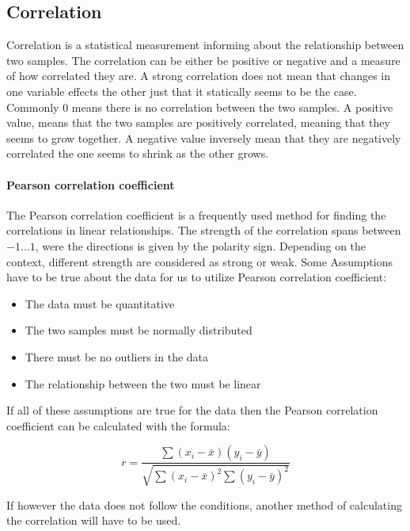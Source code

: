 \subsection{Correlation}
Correlation is a statistical measurement informing about the relationship between two samples. The correlation can be either be positive or negative and a measure of how correlated they are. A strong correlation does not mean that changes in one variable effects the other just that it statically seems to be the case. Commonly $0$ means there is no correlation between the two samples. A positive value, means that the two samples are positively correlated, meaning that they seems to grow together. A negative value inversely mean that they are negatively correlated the one seems to shrink as the other grows.

\paragraph{Pearson correlation coefficient} The Pearson correlation coefficient is a frequently used method for finding the correlations in linear relationships. The strength of the correlation spans between $-1 \dotsc 1$, were the directions is given by the polarity sign. Depending on the context, different strength are considered as strong or weak. Some Assumptions have to be true about the data for us to utilize Pearson correlation coefficient:

\begin{itemize}
    \item The data must be quantitative
    \item The two samples must be normally distributed
    \item There must be no outliers in the data
    \item The relationship between the two must be linear
\end{itemize}

If all of these assumptions are true for the data then the Pearson correlation coefficient can be calculated with the formula:

\begin{equation}
    r=\frac{\sum{(x_i-\bar{x})(y_i-\bar{y})}}{\sqrt{\sum{(x_i-\bar{x})^2}\sum{(y_i-\bar{y})^2}}}
\end{equation}

If however the data does not follow the conditions, another method of calculating the correlation will have to be used. 

